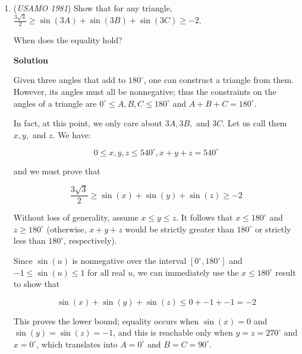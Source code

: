 \begin{enumerate}
 $CE$ cannot be air ($C$ would have all three types) or bus ($E$ would have three bus connections), so $CE$ must be rail.

 The only connection remaining is $BE$, which cannot be orange as both $B$ and $D$ would have all three types, but this means there are no air connections.

 Therefore, it is impossible with five (or more) towns.

 
A four-town mapping is possible:

 $AB$, $BC$, $CD$, and $DA$ are connected by bus.

 $AC$ is connected by rail.

 $BD$ is connected by air.

 Therefore, the maximum number of towns is $4$.

 


	\item (\textit{USAMO 1981}) Show that for any triangle, $\frac{3\sqrt{3}}{2}\ge \sin(3A) + \sin(3B) + \sin (3C) \ge -2$. 


 When does the equality hold?


 



\textbf{Solution}

Given three angles that add to $180^\circ$, one can construct a triangle from them. However, its angles must all be nonnegative; thus the constraints on the angles of a triangle are $0^\circ\le A,B,C\le180^\circ$ and $A+B+C=180^\circ$.

 In fact, at this point, we only care about $3A, 3B,$ and $3C$.  Let us call them $x, y,$ and $z$.  We have:

 
 \[0 \le x,y,z \le 540^\circ, x+y+z = 540^\circ\]

 and we must prove that

 
 \[\frac{3\sqrt{3}}{2}\ge \sin(x) + \sin(y) + \sin (z) \ge -2\]

 Without loss of generality, assume $x \le y \le z$.  It follows that $x \le 180^\circ$ and $z \ge 180^\circ$ (otherwise, $x+y+z$ would be strictly greater than $180^\circ$ or strictly less than $180^\circ$, respectively).

 Since $\sin(u)$ is nonnegative over the interval $[0^\circ, 180^\circ]$ and $-1 \le \sin (u) \le 1$ for all real $u$, we can immediately use the $x \le 180^\circ$ result to show that

 
 \[\sin( x) + \sin (y) + \sin (z) \le 0 + -1 + -1 = -2\]

 This proves the lower bound; equality occurs when $\sin(x) = 0$ and $\sin (y) = \sin (z) = -1$, and this is reachable only when $y = z = 270^\circ$ and $x = 0^\circ$, which translates into $A = 0^\circ$ and $B = C = 90^\circ$.


\end{enumerate}
